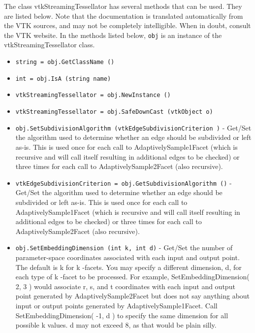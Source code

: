 The class vtkStreamingTessellator has several methods that can be used.
  They are listed below.
Note that the documentation is translated automatically from the VTK sources,
and may not be completely intelligible.  When in doubt, consult the VTK website.
In the methods listed below, \verb|obj| is an instance of the vtkStreamingTessellator class.
\begin{itemize}
\item  \verb|string = obj.GetClassName ()|

\item  \verb|int = obj.IsA (string name)|

\item  \verb|vtkStreamingTessellator = obj.NewInstance ()|

\item  \verb|vtkStreamingTessellator = obj.SafeDownCast (vtkObject o)|

\item  \verb|obj.SetSubdivisionAlgorithm (vtkEdgeSubdivisionCriterion )| -  Get/Set the algorithm used to determine whether an edge should be
 subdivided or left as-is. This is used once for each call to
 AdaptivelySample1Facet (which is recursive and will call itself
 resulting in additional edges to be checked) or three times for
 each call to AdaptivelySample2Facet (also recursive).

\item  \verb|vtkEdgeSubdivisionCriterion = obj.GetSubdivisionAlgorithm ()| -  Get/Set the algorithm used to determine whether an edge should be
 subdivided or left as-is. This is used once for each call to
 AdaptivelySample1Facet (which is recursive and will call itself
 resulting in additional edges to be checked) or three times for
 each call to AdaptivelySample2Facet (also recursive).

\item  \verb|obj.SetEmbeddingDimension (int k, int d)| -  Get/Set the number of parameter-space coordinates associated with each input and output point.
 The default is  k for  k -facets. You may
 specify a different dimension,  d, for each type of  k -facet to be processed.
 For example,  SetEmbeddingDimension(  2,  3 ) would associate  r,  s, and
  t coordinates with each input and output point generated by  AdaptivelySample2Facet
 but does not say anything about input or output points generated by
  AdaptivelySample1Facet. 
 Call  SetEmbeddingDimension(  -1,  d ) to specify the same dimension for
 all possible  k values.
  d may not exceed 8, as that would be plain silly.


\end{itemize}
